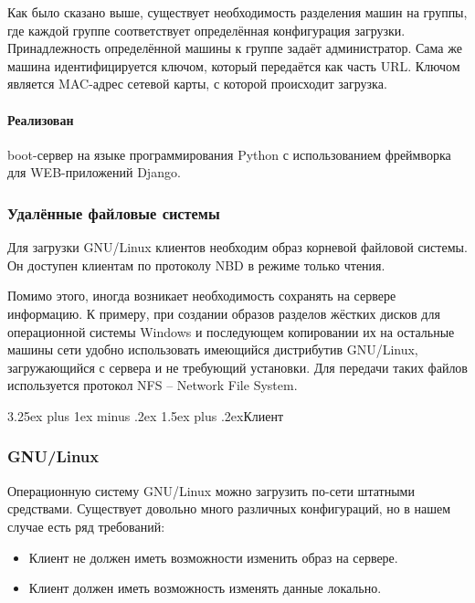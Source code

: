 \documentclass[11pt]{article}
\makeatletter
\renewcommand{\subsection}{\@startsection{subsection}{2}%
{\parindent}{3.25ex plus 1ex minus .2ex}%
{1.5ex plus .2ex}{\bfseries}}
\makeatother
\begin{document}
Как было сказано выше, существует необходимость разделения машин на группы,
где каждой группе соответствует определённая конфигурация загрузки. Принадлежность
определённой машины к группе задаёт администратор. Сама же машина идентифицируется ключом,
который передаётся как часть URL. Ключом является MAC-адрес сетевой карты, с которой
происходит загрузка.

\paragraph{Реализован} boot-сервер на языке программирования Python
с использованием фреймворка для WEB-приложений Django.

\subsubsection{Удалённые файловые системы}
Для загрузки GNU/Linux клиентов необходим образ
корневой файловой системы. Он доступен клиентам
по протоколу NBD в режиме только чтения.

Помимо этого, иногда возникает необходимость
сохранять на сервере информацию. К примеру,
при создании образов разделов жёстких дисков
для операционной системы Windows и последующем
копировании их на остальные машины сети
удобно использовать имеющийся дистрибутив GNU/Linux,
загружающийся с сервера и не требующий установки.
Для передачи таких файлов используется протокол NFS --
Network File System.

\subsection{Клиент}

\subsubsection{GNU/Linux}
Операционную систему GNU/Linux можно загрузить по-сети
штатными средствами. Существует довольно много различных
конфигураций, но в нашем случае есть ряд требований:
\begin{itemize}
    \item Клиент не должен иметь возможности изменить образ на сервере.
    \item Клиент должен иметь возможность изменять данные локально.
\end{itemize}
\end{document}
